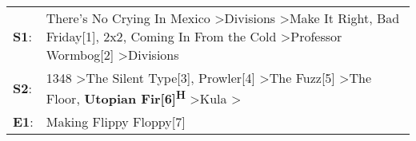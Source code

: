 \begin{supertabular}{p{0.03\textwidth}p{0.92\textwidth}}
 \textbf{S1}:  &  There's No Crying In Mexico\textsuperscript{} \textgreater \enspace Divisions\textsuperscript{} \textgreater \enspace Make It Right\textsuperscript{}, \enspace Bad Friday[1]\textsuperscript{}, \enspace 2x2\textsuperscript{}, \enspace Coming In From the Cold\textsuperscript{} \textgreater \enspace Professor Wormbog[2]\textsuperscript{} \textgreater \enspace Divisions\textsuperscript{}  \enspace  \\
 \textbf{S2}:  &                       1348\textsuperscript{} \textgreater \enspace The Silent Type[3]\textsuperscript{}, \enspace Prowler[4]\textsuperscript{} \textgreater \enspace The Fuzz[5]\textsuperscript{} \textgreater \enspace The Floor\textsuperscript{}, \enspace \textbf{Utopian Fir[6]\textsuperscript{H}} \textgreater \enspace Kula\textsuperscript{} \textgreater {}\textsuperscript{}  \enspace  \\
 \textbf{E1}:  &                                                                                                                                                                                                                                                                                                                                                           Making Flippy Floppy[7]\textsuperscript{}  \enspace  \\
\end{supertabular}
